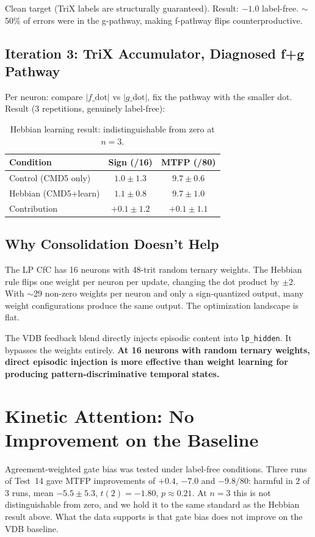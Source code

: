 \documentclass[11pt,letterpaper]{article}
\begin{document}
Clean target (TriX labels are structurally guaranteed). Result: $-1.0$ label-free. $\sim$50\% of errors were in the g-pathway, making f-pathway flips counterproductive.

\subsection{Iteration 3: TriX Accumulator, Diagnosed f+g Pathway}

Per neuron: compare $|f\_\text{dot}|$ vs $|g\_\text{dot}|$, fix the pathway with the smaller dot. Result (3 repetitions, genuinely label-free):

\begin{table}[h]
\centering
\begin{tabular}{l cc}
\toprule
Condition & Sign (/16) & MTFP (/80) \\
\midrule
Control (CMD5 only) & $1.0 \pm 1.3$ & $9.7 \pm 0.6$ \\
Hebbian (CMD5+learn) & $1.1 \pm 0.8$ & $9.7 \pm 1.0$ \\
Contribution & $+0.1 \pm 1.2$ & $+0.1 \pm 1.1$ \\
\bottomrule
\end{tabular}
\caption{Hebbian learning result: indistinguishable from zero at $n=3$.}
\end{table}

\subsection{Why Consolidation Doesn't Help}

The LP CfC has 16 neurons with 48-trit random ternary weights. The Hebbian rule flips one weight per neuron per update, changing the dot product by $\pm 2$. With $\sim$29 non-zero weights per neuron and only a sign-quantized output, many weight configurations produce the same output. The optimization landscape is flat.

The VDB feedback blend directly injects episodic content into \texttt{lp\_hidden}. It bypasses the weights entirely. \textbf{At 16 neurons with random ternary weights, direct episodic injection is more effective than weight learning for producing pattern-discriminative temporal states.}

\section{Kinetic Attention: No Improvement on the Baseline}

Agreement-weighted gate bias was tested under label-free conditions. Three runs of Test~14 gave MTFP improvements of $+0.4$, $-7.0$ and $-9.8$/80: harmful in 2 of 3 runs, mean $-5.5 \pm 5.3$, $t(2) = -1.80$, $p \approx 0.21$. At $n=3$ this is not distinguishable from zero, and we hold it to the same standard as the Hebbian result above. What the data supports is that gate bias does not improve on the VDB baseline.
\end{document}
